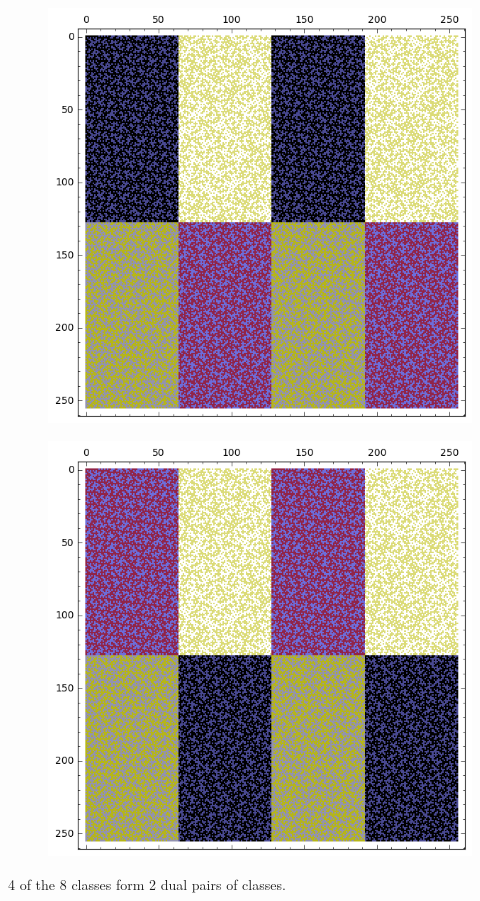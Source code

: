 \documentclass[12pt,a4paper]{article}
\begin{document}
\begin{figure}[!hb]
\centering
\begin{minipage}{.48\textwidth}
  \centering
  \includegraphics[width=.9\linewidth]{../matrix_plot/re8_9_bent_cayley_graph_index_matrix.png}
  \label{fig:c8_9_bent_cayley_graph_index_matrix}
\end{minipage}
\begin{minipage}{.48\textwidth}
  \centering
  \includegraphics[width=.9\linewidth]{../matrix_plot/re8_9_dual_cayley_graph_index_matrix.png}
  \label{fig:c8_9_dual_cayley_graph_index_matrix}
\end{minipage}%
\end{figure}
4 of the 8 classes form 2 dual pairs of classes.
\end{document}
